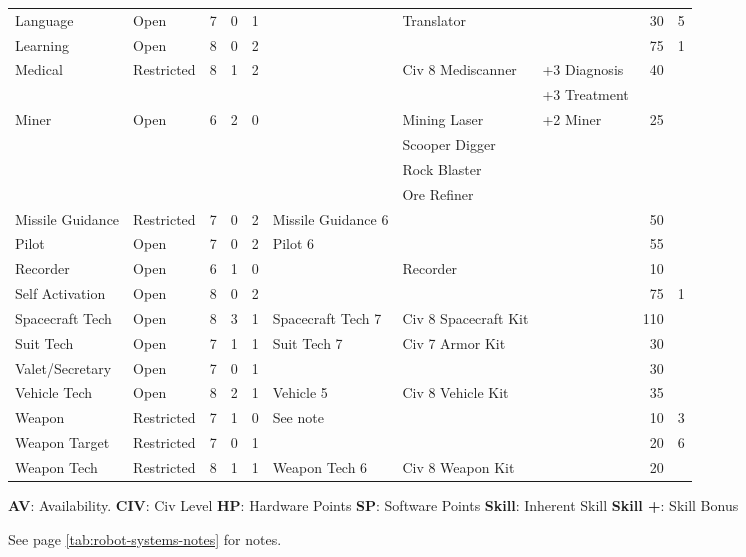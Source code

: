\begin{table}[htbp]
{\begin{minipage}{\textwidth}
\begin{small}
\begin{tabular}{llccclllrc}
          Language & Open & 7 & 0 & 1 & &Translator & &30 & 5\\
          Learning & Open & 8 & 0 & 2 & &&&75 & 1\\
          \rowcolor{grey}
          Medical & Restricted & 8 & 1 & 2 & &Civ 8 Mediscanner & +3 Diagnosis & 40&\\
          \rowcolor{grey}
          &&&&&&&+3 Treatment&&\\
          Miner & Open & 6 & 2 & 0 & &Mining Laser & +2 Miner & 25\\
          &&&&&&Scooper Digger\\
          &&&&&&Rock Blaster\\
          &&&&&&Ore Refiner\\
          \rowcolor{grey}
          Missile Guidance & Restricted & 7 & 0 & 2 & Missile Guidance 6 & &&50&\\
          Pilot & Open & 7 & 0 & 2 & Pilot 6 & &&55\\
          \rowcolor{grey}
          Recorder & Open & 6 & 1 & 0 & &Recorder & &10&\\
          Self Activation & Open & 8 & 0 & 2 & &&&75 & 1\\
          \rowcolor{grey}
          Spacecraft Tech & Open & 8 & 3 & 1 & Spacecraft Tech 7 & Civ 8 Spacecraft Kit & &110&\\
          Suit Tech & Open & 7 & 1 & 1 & Suit Tech 7 & Civ 7 Armor Kit & &30\\
          \rowcolor{grey}
          Valet/Secretary & Open & 7 & 0 & 1 & &&&30&\\
          Vehicle Tech & Open & 8 & 2 & 1 & Vehicle 5 & Civ 8 Vehicle Kit & &35\\
          \rowcolor{grey}
          Weapon & Restricted & 7 & 1 & 0 & See note & &&10 & 3\\
          Weapon Target & Restricted & 7 & 0 & 1 & &&&20 & 6\\
          \rowcolor{grey}
          Weapon Tech & Restricted & 8 & 1 & 1 & Weapon Tech 6 & Civ 8 Weapon Kit & &20&
        \end{tabular}

        \medskip
        
        \parbox{\textwidth}{\textbf{AV}: Availability. \textbf{CIV}:
          Civ Level \textbf{HP}: Hardware Points \textbf{SP}: Software
          Points \textbf{Skill}: Inherent Skill \textbf{Skill +}:
          Skill Bonus

          See page \ref{tab:robot-systems-notes} for notes.}
      \end{small}
    \end{minipage}}
\end{table}


